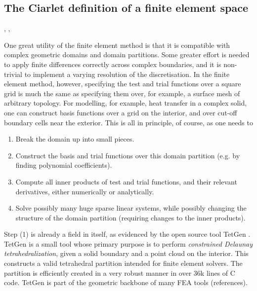 \subsection{The Ciarlet definition of a finite element space}
\cite{ciarlet}, \cite{ham_fem}, \cite{fenics_book}



One great utility of the finite element method is that it is compatible with complex geometric domains and domain partitions.
Some greater effort is needed to apply finite differences correctly across complex boundaries, and it is non-trivial to implement
a varying resolution of the discretisation. In the finite element method, however, specifying the test and trial functions over
a square grid is much the same as specifying them over, for example, a surface mesh of arbitrary topology. For modelling, for example,
heat transfer in a complex solid, one can construct basis functions over a grid on the interior, and over cut-off boundary cells near the exterior.
This is all in principle, of course, as one needs to
\begin{enumerate}
    \item Break the domain up into small pieces.
    \item Construct the basis and trial functions over this domain partition (e.g. by finding polynomial coefficients).
    \item Compute all inner products of test and trial functions, and their relevant derivatives, either numerically or analytically.
    \item Solve possibly many huge sparse linear systems, while possibly changing the structure of the domain partition (requiring changes to the inner products).
\end{enumerate}

Step (1) is already a field in itself, as evidenced by the open source tool TetGen \cite{tetgen}.
TetGen is a small tool whose primary purpose is to perform \textit{constrained Delaunay tetrahedralization}, given a solid boundary and a point cloud on the interior.
This constructs a valid tetrahedral partition intended for finite element solvers. The partition is efficiently created in a very robust manner in over 36k lines of C code. TetGen is part of the geometric backbone of many FEA tools (references).
